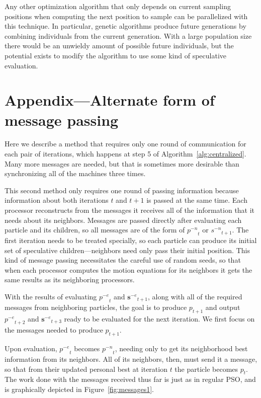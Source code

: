\documentclass[smallcondensed]{svjour3}
\newcommand{\fig}[1]{Figure~\ref{fig:#1}}
\newcommand{\alg}[1]{Algorithm~\ref{alg:#1}}
\providecommand{\noeval}[1]{\ensuremath{#1^{-e}}}
\providecommand{\nonbest}[1]{\ensuremath{#1^{-n}}}
\providecommand{\p}{\ensuremath{p}}
\providecommand{\s}{\ensuremath{s}}
\providecommand{\sset}{\ensuremath{\mathbf{s}}}
\begin{document}
Any other optimization algorithm that only depends on current sampling
positions when computing the next position to sample can be parallelized with
this technique.  In particular, genetic algorithms produce future generations
by combining individuals from the current generation.  With a large population
size there would be an unwieldy amount of possible future individuals, but the
potential exists to modify the algorithm to use some kind of speculative
evaluation.

\section*{Appendix---Alternate form of message passing}

Here we describe a method that requires only one round of communication for
each pair of iterations, which happens at step 5 of \alg{centralized}.  Many
more messages are needed, but that is sometimes more desirable than
synchronizing all of the machines three times.

This second method only requires one round of passing information because
information about both iterations $t$ and $t+1$ is passed at the same time.
Each processor reconstructs from the messages it receives all of the
information that it needs about its neighbors.  Messages are passed directly
after evaluating each particle and its children, so all messages are of the
form of $\nonbest{\p}_t$ or $\nonbest{\s}_{t+1}$.  The first iteration needs to
be treated specially, so each particle can produce its initial set of
speculative children---neighbors need only pass their initial position.  This
kind of message passing necessitates the careful use of random seeds, so that
when each processor computes the motion equations for its neighbors it gets the
same results as its neighboring processors.

With the results of evaluating $\noeval{\p}_t$ and $\noeval{\sset}_{t+1}$,
along with all of the required messages from neighboring particles, the goal is
to produce $\p_{t+1}$ and output $\noeval{\p}_{t+2}$ and $\noeval{\sset}_{t+3}$
ready to be evaluated for the next iteration.  We first focus on the messages
needed to produce $\p_{t+1}$.

Upon evaluation, $\noeval{\p}_t$ becomes $\nonbest{\p}_t$, needing only to get
its neighborhood best information from its neighbors.  All of its neighbors,
then, must send it a message, so that from their updated personal best at
iteration $t$ the particle becomes $\p_t$.  The work done with the messages
received thus far is just as in regular PSO, and is graphically depicted in 
\fig{messages1}.
\end{document}
